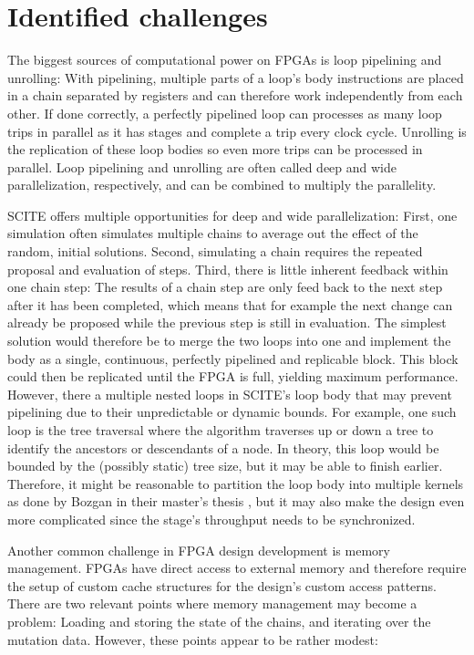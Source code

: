 \section{Identified challenges}

The biggest sources of computational power on \acp{FPGA} is loop pipelining and unrolling: With pipelining, multiple parts of a loop's body instructions are placed in a chain separated by registers and can therefore work independently from each other. If done correctly, a perfectly pipelined loop can processes as many loop trips in parallel as it has stages and complete a trip every clock cycle. Unrolling is the replication of these loop bodies so even more trips can be processed in parallel. Loop pipelining and unrolling are often called deep and wide parallelization, respectively, and can be combined to multiply the parallelity.

\ac{SCITE} offers multiple opportunities for deep and wide parallelization: First, one simulation often simulates multiple chains to average out the effect of the random, initial solutions. Second, simulating a chain requires the repeated proposal and evaluation of steps. Third, there is little inherent feedback within one chain step: The results of a chain step are only feed back to the next step after it has been completed, which means that for example the next change can already be proposed while the previous step is still in evaluation. The simplest solution would therefore be to merge the two loops into one and implement the body as a single, continuous, perfectly pipelined and replicable block. This block could then be replicated until the \ac{FPGA} is full, yielding maximum performance. However, there a multiple nested loops in \ac{SCITE}'s loop body that may prevent pipelining due to their unpredictable or dynamic bounds. For example, one such loop is the tree traversal where the algorithm traverses up or down a tree to identify the ancestors or descendants of a node. In theory, this loop would be bounded by the (possibly static) tree size, but it may be able to finish earlier. Therefore, it might be reasonable to partition the loop body into multiple kernels as done by Bozgan in their master's thesis \cite{bozgan_2019}, but it may also make the design even more complicated since the stage's throughput needs to be synchronized.

Another common challenge in \ac{FPGA} design development is memory management. \acp{FPGA} have direct access to external memory and therefore require the setup of custom cache structures for the design's custom access patterns. There are two relevant points where memory management may become a problem: Loading and storing the state of the chains, and iterating over the mutation data. However, these points appear to be rather modest:

